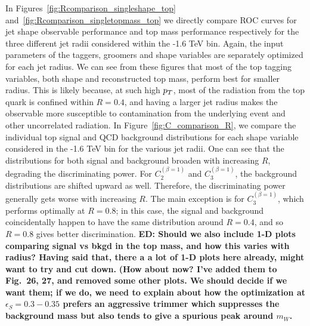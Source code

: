 In Figures~\ref{fig:Rcomparison_singleshape_top} and~\ref{fig:Rcomparison_singletopmass_top} we directly compare ROC curves for jet shape observable performance and top mass performance respectively for the three different jet radii considered within the -1.6 TeV bin. Again, the input parameters of the taggers, groomers and shape variables are separately optimized for each jet radius. We can see from these figures that most of the top tagging variables, both shape and reconstructed top mass, perform best for smaller radius. This is likely because, at such high $p_T$, most of the radiation from the top quark is confined within $R=0.4$, and having a larger jet radius makes the observable more susceptible to contamination from the underlying event and other uncorrelated radiation. In Figure~\ref{fig:C_comparison_R}, we compare the individual top signal and QCD background distributions for each shape variable considered in the -1.6 TeV bin for the various jet radii. One can see that the distributions for both signal and background broaden with increasing $R$, degrading the discriminating power. For $C_2^{(\beta=1)}$ and $C_3^{(\beta=1)}$, the background distributions are shifted upward as well. Therefore, the discriminating power generally gets worse with increasing $R$. The main exception is   for $C_3^{(\beta=1)}$, which performs optimally at $R=0.8$; in this case, the signal and background coincidentally happen to have the same distribution around $R=0.4$, and so $R=0.8$ gives better discrimination.
{\bf ED: Should we also include 1-D plots comparing signal vs bkgd in the top mass, and how this varies with radius? Having said that, there a a lot of 1-D plots here already, might want to try and cut down.} {\bf (How about now? I've added them to Fig.~26, 27, and removed some other plots. We should decide if we want them; if we do, we need to explain about how the optimization at $\epsilon_S = 0.3-0.35$ prefers an aggressive trimmer which suppresses the background mass but also tends to give a spurious peak around $m_W$.} 


